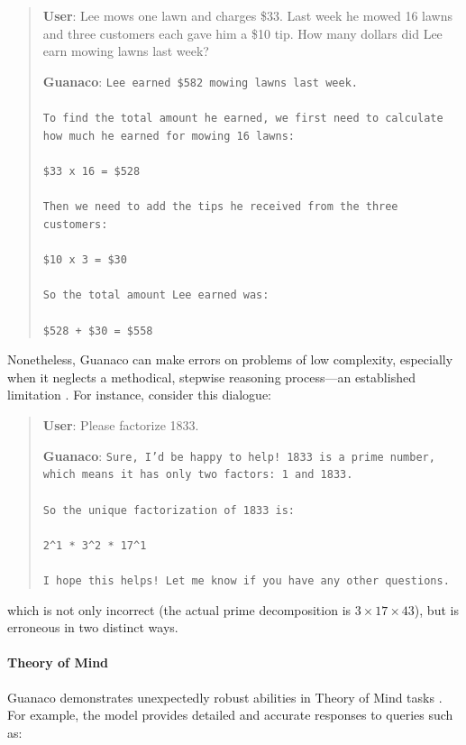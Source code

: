 \begin{quote}
    \textbf{User}: Lee mows one lawn and charges \$33. Last week he mowed 16 lawns and three customers each gave him a \$10 tip. How many dollars did Lee earn mowing lawns last week?

    \textbf{Guanaco}: \texttt{Lee earned \$582 mowing lawns last week. \\ \\ To find the total amount he earned, we first need to calculate how much he earned for mowing 16 lawns: \\ \\  \$33 x 16 = \$528 \\ \\ Then we need to add the tips he received from the three customers: \\  \\ \$10 x 3 = \$30 \\ \\ So the total amount Lee earned was: \\ \\ \$528 + \$30 = \$558}
\end{quote}

Nonetheless, {Guanaco} can make errors on problems of low complexity, especially when it neglects a methodical, stepwise reasoning process—an established limitation \cite{weichain}. For instance, consider this dialogue:

\begin{quote}
    \textbf{User}: Please factorize 1833.

    \textbf{Guanaco}: \texttt{Sure, I'd be happy to help! 1833 is a prime number, which means it has only two factors: 1 and 1833. \\ \\ So the unique factorization of 1833 is: \\ \\ 2\^{}1 * 3\^{}2 * 17\^{}1 \\ \\ I hope this helps! Let me know if you have any other questions.}
\end{quote}

which is not only incorrect (the actual prime decomposition is $3 \times 17 \times 43$), but is erroneous in two distinct ways.

\paragraph{Theory of Mind} {Guanaco} demonstrates unexpectedly robust abilities in Theory of Mind tasks \cite{nematzadeh2018evaluating, sap2022neural}. For example, the model provides detailed and accurate responses to queries such as:


